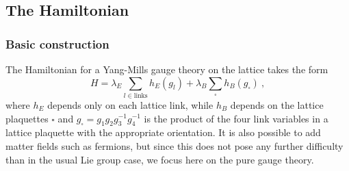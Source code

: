 \subsection{The Hamiltonian}

\subsubsection{Basic construction}\label{eq:hamiltonian basic construction}

The Hamiltonian for a Yang-Mills gauge theory on the lattice takes the form \cite{kogut2975hamiltonian, ZoharBurrello}
\begin{equation}
    \label{eq:generic hamiltonian}
    H = \lambda_E \sum_{l \in \mathrm{links}} h_E(g_l) + \lambda_B \sum_{\square} h_B(g_\square) \ ,
\end{equation}
where $h_E$ depends only on each lattice link, while $h_B$ depends on the lattice plaquettes $\square$ and $g_\square = g_1 g_2 g_3^{-1} g_4^{-1}$ is the product of the four link variables in a lattice plaquette with the appropriate orientation.
It is also possible to add matter fields such as fermions, but since this does not pose any further difficulty than in the usual Lie group case, we focus here on the pure gauge theory.

